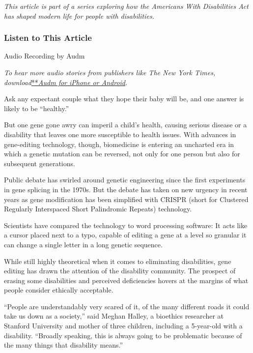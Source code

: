 \emph{This article is part of a series exploring how the Americans With
Disabilities Act has shaped modern life for people with disabilities.}

\hypertarget{listen-to-this-article}{%
\subsubsection{Listen to This Article}\label{listen-to-this-article}}

Audio Recording by Audm

\emph{To hear more audio stories from publishers like The New York
Times,
download}\href{https://www.audm.com/?utm_source=nytmag\&utm_medium=embed\&utm_campaign=left_behind_draper}{**}\href{https://www.audm.com/?utm_source=nyt\&utm_medium=embed\&utm_campaign=gene_editing_reality}{\emph{Audm
for iPhone or Android}}\emph{.}

Ask any expectant couple what they hope their baby will be, and one
answer is likely to be ``healthy.''

But one gene gone awry can imperil a child's health, causing serious
disease or a disability that leaves one more susceptible to health
issues. With advances in gene-editing technology, though, biomedicine is
entering an uncharted era in which a genetic mutation can be reversed,
not only for one person but also for subsequent generations.

Public debate has swirled around genetic engineering since the first
experiments in gene splicing in the 1970s. But the debate has taken on
new urgency in recent years as gene modification has been simplified
with CRISPR (short for Clustered Regularly Interspaced Short Palindromic
Repeats) technology.

Scientists have compared the technology to word processing software: It
acts like a cursor placed next to a typo, capable of editing a gene at a
level so granular it can change a single letter in a long genetic
sequence.

While still highly theoretical when it comes to eliminating
disabilities, gene editing has drawn the attention of the disability
community. The prospect of erasing some disabilities and perceived
deficiencies hovers at the margins of what people consider ethically
acceptable.

``People are understandably very scared of it, of the many different
roads it could take us down as a society,'' said Meghan Halley, a
bioethics researcher at Stanford University and mother of three
children, including a 5-year-old with a disability. ``Broadly speaking,
this is always going to be problematic because of the many things that
disability means.''

